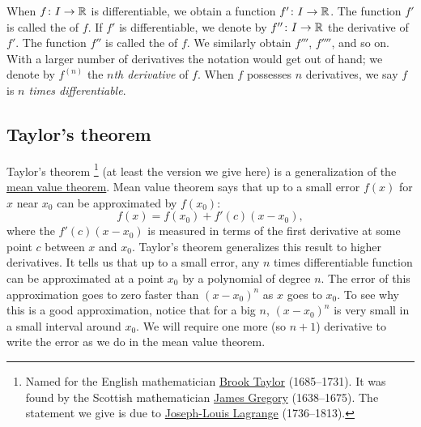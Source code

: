 When $f \colon I \to {\mathbb{R}}$ is differentiable, we obtain a function
$f' \colon I \to {\mathbb{R}}$.  The function
$f'$ is called the \emph{} of $f$.
If $f'$ is differentiable, we denote by
$f'' \colon I \to {\mathbb{R}}$ the derivative of $f'$.  The function $f''$
is called the \emph{} of $f$.
We similarly obtain
$f'''$, $f''''$, and so on.
With a larger number of derivatives
the notation would get out of hand; we denote
by $f^{(n)}$ the
\emph{$n$th derivative} of $f$.
%
When $f$ possesses $n$ derivatives, we say $f$ is
\emph{$n$ times differentiable}.

\subsection{Taylor's theorem}

Taylor's theorem%
\footnote{Named for the English mathematician
\href{https://en.wikipedia.org/wiki/Brook_Taylor}{Brook Taylor}
(1685--1731).
It was found by
the Scottish mathematician
\href{https://en.wikipedia.org/wiki/James_Gregory_(mathematician)}{James Gregory}
(1638--1675).  The statement we give
is due to
\href{https://en.wikipedia.org/wiki/Lagrange}{Joseph-Louis Lagrange}
(1736--1813).} (at least the version we give here)
is a generalization of the \hyperref[thm:mvt]{mean value theorem}.
Mean value theorem says that up to a small error $f(x)$ for $x$ near $x_0$ can be
approximated by $f(x_0)$:
\begin{equation*}
f(x) = f(x_0) + f'(c)(x-x_0),
\end{equation*}
where the  $f'(c)(x-x_0)$
is measured in terms of the first derivative
at some point $c$ between $x$ and $x_0$.
Taylor's theorem generalizes this result to higher derivatives.
It tells us that up to a small error, any $n$
times differentiable function can be approximated at a point $x_0$
by a polynomial of degree $n$.  The
error of this approximation goes to zero faster than ${(x-x_0)}^{n}$ as
$x$ goes to $x_0$.
To see why this is a good approximation, notice that for a big $n$, 
${(x-x_0)}^n$ is very small in a small interval around $x_0$.
We will require one more (so $n+1$) derivative to write the error
as we do in the mean value theorem.

